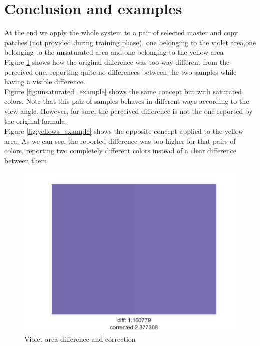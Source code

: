 \documentclass[twocolumn,a4paper]{article}
\begin{document}
\section{Conclusion and examples} At the end we apply the whole system to a pair of selected master and copy patches (not provided during training phase), one belonging to the violet area,one belonging to the unsaturated area and one belonging to the yellow area\\
Figure \ref{fig:violet_example} shows how the original difference was too way different from the perceived one, reporting quite no differences between the two samples while having a visible difference.\\
Figure \ref{fig:unsaturated_example} shows the same concept but with saturated colors. Note that this pair of samples behaves in different ways according to the view angle. However, for sure, the perceived difference is not the one reported by the original formula.\\
Figure \ref{fig:yellows_example} shows the opposite concept applied to the yellow area. As we can see, the reported difference was too higher for that pairs of colors, reporting two completely different colors instead of a clear difference between them.
\newpage
\begin{figure}[H]
	\centering
	\includegraphics[scale=0.5]{images/example_violet.png}
	\caption{Violet area difference and correction}
	\label{fig:violet_example}
\end{figure}
\end{document}
